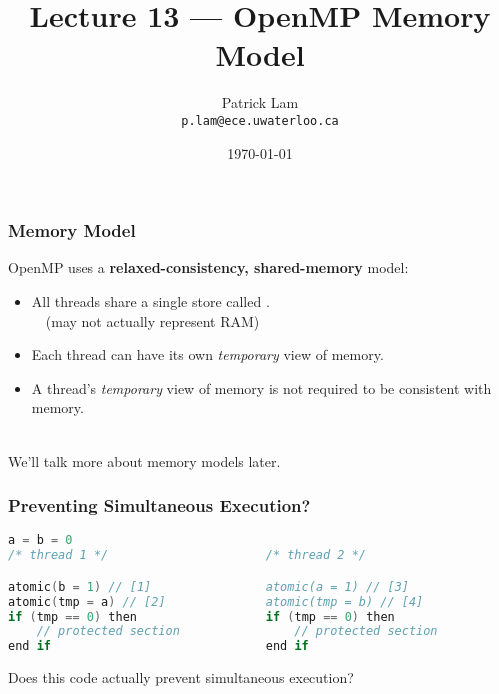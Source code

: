 

\title{Lecture 13 --- OpenMP Memory Model }

\author{Patrick Lam \\ \small \texttt{p.lam@ece.uwaterloo.ca}}
\date{\today}




\begin{frame}
  \titlepage

 \end{frame}

\begin{frame}
  \frametitle{Memory Model}

  

  OpenMP uses a {\bf relaxed-consistency, shared-memory} model:

  \begin{itemize}
    \item All threads share a single store called
      .\\ ~~(may not actually represent RAM)\\[1em]
    \item Each thread can have its own {\it temporary} view of memory.\\[1em]
    \item A thread's {\it temporary} view of memory is not required to be
      consistent with memory.
  \end{itemize}~\\

  We'll talk more about memory models later.
  
\end{frame}

\begin{frame}[fragile]
  \frametitle{Preventing Simultaneous Execution?}

  \begin{lstlisting}[language=C,morekeywords={foreach,pragma,omp,parallel,single,nowait,task,untied,barrier,taskyield,mergeable,final,taskwait,critical}]
                    a = b = 0
/* thread 1 */                      /* thread 2 */

atomic(b = 1) // [1]                atomic(a = 1) // [3]
atomic(tmp = a) // [2]              atomic(tmp = b) // [4]
if (tmp == 0) then                  if (tmp == 0) then
    // protected section                // protected section
end if                              end if
  \end{lstlisting}

  
 Does this code actually prevent simultaneous execution?
  
\end{frame}

